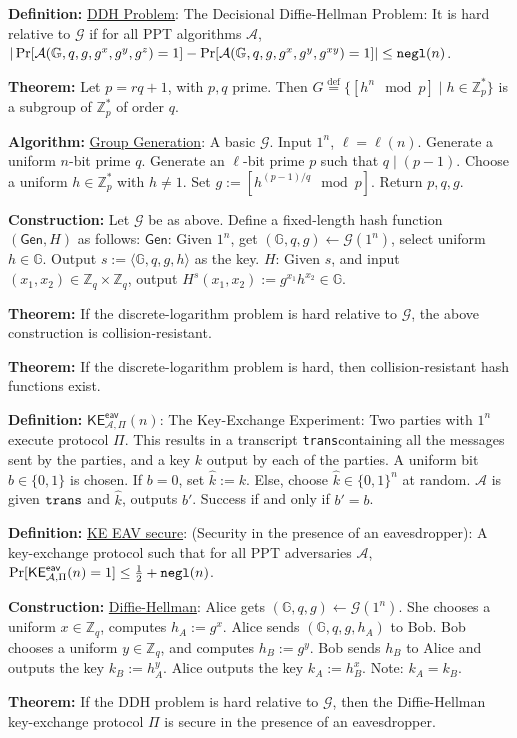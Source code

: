 \documentclass[10pt]{article}
\newcommand{\Z}{\mathbb{Z}}
\newcommand{\G}{\mathbb{G}}
\newcommand{\AAA}{\mathcal{A}}
\newcommand{\GGG}{\mathcal{G}}
\newcommand{\defn}[1]{{\bf Definition:} \underline{#1}}
\newcommand{\thm}[1]{{\bf Theorem:} \underline{#1}}
\newcommand{\con}[1]{{\bf Construction:} \underline{#1}}
\newcommand{\alg}[1]{{\bf Algorithm:} \underline{#1}}
\newcommand{\Gen}{\mathsf{Gen}}
\newcommand{\ang}[1]{\langle#1\rangle}
\newcommand{\ExptKEArgs}[2]{\mathsf{KE}^{\mathsf{eav}}_{#1,#2}}
\newcommand{\ExptKE}{\ExptKEArgs{\AAA}{\Pi}}
\newcommand{\negl}{{\tt negl}}
\newcommand{\trans}{{\tt trans}}
\newcommand{\from}{\leftarrow}
\begin{document}
\begin{multicols}{3}
\defn{DDH Problem}: The Decisional Diffie-Hellman Problem: It is hard relative to $\GGG$ if for all PPT algorithms $\AAA$, $|\Pr[\AAA(\G,q,g,g^x,g^y,g^z)=1]-\Pr[\AAA(\G,q,g,g^x,g^y,g^{xy})=1]|\leq\negl(n)$.

\thm{}Let $p=rq+1$, with $p,q$ prime. Then $G\overset{\text{def}}{=}\{[h^n\mod{p}]\mid h\in\Z^*_p\}$ is a subgroup of $\Z^*_p$ of order $q$.

\alg{Group Generation}: A basic $\GGG$. Input $1^n$, $\ell=\ell(n)$. Generate a uniform $n$-bit prime $q$. Generate an $\ell$-bit prime $p$ such that $q\mid (p-1)$. Choose a uniform $h\in\Z_p^*$ with $h\neq 1$. Set $g:=[h^{(p-1)/q}\mod{p}]$. Return $p,q,g$.

\con{}Let $\GGG$ be as above. Define a fixed-length hash function $(\Gen,H)$ as follows: $\Gen$: Given $1^n$, get $(\G,q,g)\from\GGG(1^n)$, select uniform $h\in\G$. Output $s:=\ang{\G,q,g,h}$ as the key. $H$: Given $s$, and input $(x_1,x_2)\in\Z_q\times\Z_q$, output $H^s(x_1,x_2):=g^{x_1}h^{x_2}\in\G$.

\thm{}If the discrete-logarithm problem is hard relative to $\GGG$, the above construction is collision-resistant.

\thm{}If the discrete-logarithm problem is hard, then collision-resistant hash functions exist.

\defn{$\ExptKE(n)$}: The Key-Exchange Experiment: Two parties with $1^n$ execute protocol $\Pi$. This results in a transcript \trans containing all the messages sent by the parties, and a key $k$ output by each of the parties. A uniform bit $b\in\{0,1\}$ is chosen. If $b=0$, set $\hat{k}:=k$. Else, choose $\hat{k}\in\{0,1\}^n$ at random. $\AAA$ is given $\trans$ and $\hat{k}$, outputs $b'$. Success if and only if $b'=b$.

\defn{KE EAV secure}: (Security in the presence of an eavesdropper): A key-exchange protocol such that for all PPT adversaries $\AAA$, $\Pr[\ExptKE(n)=1]\leq\frac{1}{2}+\negl(n)$.

\con{Diffie-Hellman}: Alice gets $(\G,q,g)\from\GGG(1^n)$. She chooses a uniform $x\in\Z_q$, computes $h_A:=g^x$. Alice sends $(\G,q,g,h_A)$ to Bob. Bob chooses a uniform $y\in\Z_q$, and computes $h_B:=g^y$. Bob sends $h_B$ to Alice and outputs the key $k_B:=h^y_A$. Alice outputs the key $k_A:=h_B^x$. Note: $k_A=k_B$.

\thm{}If the DDH problem is hard relative to $\GGG$, then the Diffie-Hellman key-exchange protocol $\Pi$ is secure in the presence of an eavesdropper.


\end{multicols}
\end{document}
